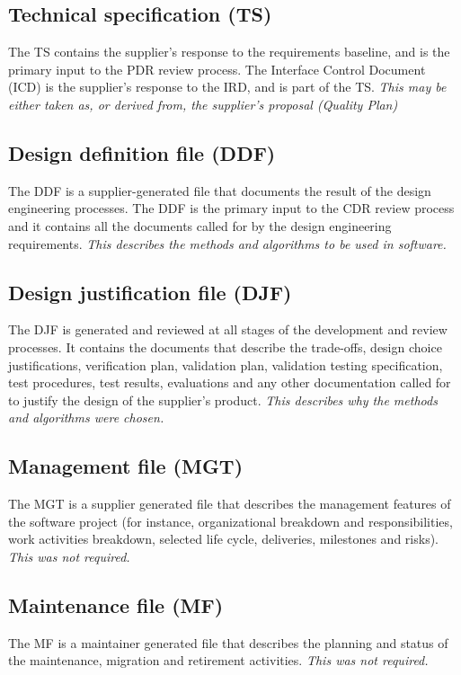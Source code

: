 \documentclass[12pt]{article}
\begin{document}
\subsection{Technical specification (TS)}
The TS contains the supplier's response to the
requirements baseline, and is the primary input to the PDR review process.
The Interface Control Document (ICD) is the supplier's response to the IRD, and is part of the TS.
\emph{This may be either taken as, or derived from, the supplier's proposal (Quality Plan)}

\subsection{Design definition file (DDF)}
The DDF is a supplier-generated file that
documents the result of the design engineering processes.
The DDF is the primary input to the CDR review process and it contains
all the documents called for by the design engineering requirements.
\emph{This describes the methods and algorithms to be used in software.}

\subsection{Design justification file (DJF)}
The DJF is generated and reviewed at all stages of the development and review processes.
It contains the documents that describe the trade-offs, design choice justifications, verification plan, validation plan, validation testing specification,
test procedures, test results, evaluations and any other documentation called for to justify the design of the supplier's product.
\emph{This describes why the methods and algorithms were chosen.}

\subsection{Management file (MGT)}
The MGT is a supplier generated file
that describes the management features of the software project (for instance,
organizational breakdown and responsibilities, work activities breakdown,
selected life cycle, deliveries, milestones and risks).
\emph{This was not required.}


\subsection{Maintenance file (MF)}
The MF is a maintainer generated file
that describes the planning and status of the maintenance, migration and retirement activities.
\emph{This was not required.}
\end{document}
